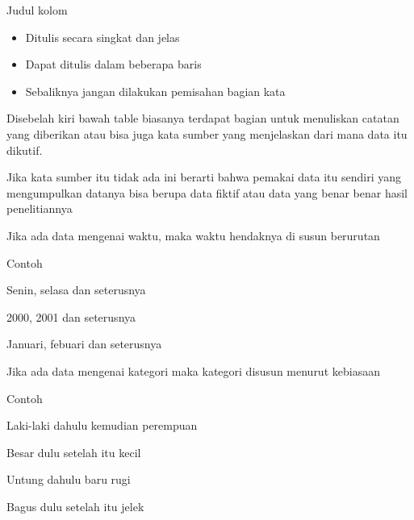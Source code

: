 \vspace{\baselineskip}
\noindent Judul kolom\par

\begin{itemize}
	\vspace{\baselineskip}
	\item Ditulis secara singkat dan jelas\par
\vspace{\baselineskip}
	\item Dapat ditulis dalam beberapa baris\par
\vspace{\baselineskip}
	\item Sebaliknya jangan dilakukan pemisahan bagian kata
\end{itemize}\par

\vspace{\baselineskip}

Disebelah kiri bawah table biasanya terdapat bagian untuk menuliskan catatan yang diberikan atau bisa juga kata sumber yang menjelaskan dari mana data itu dikutif. \par 

\vspace{\baselineskip}
Jika kata sumber itu tidak ada ini berarti bahwa pemakai data itu sendiri yang mengumpulkan datanya bisa berupa data fiktif atau data yang benar benar hasil penelitiannya\par

\vspace{\baselineskip}

 Jika ada data mengenai waktu, maka waktu hendaknya di susun berurutan\par

\vspace{\baselineskip}
\noindent Contoh\par

\vspace{\baselineskip}
Senin, selasa dan seterusnya\par
\vspace{\baselineskip}
2000, 2001 dan seterusnya\par
\vspace{\baselineskip}
Januari, febuari dan seterusnya\par

\vspace{\baselineskip}

 Jika ada data mengenai kategori maka kategori disusun menurut kebiasaan\par

\vspace{\baselineskip}
\noindent Contoh\par

\vspace{\baselineskip}

Laki-laki dahulu kemudian perempuan\par

\vspace{\baselineskip}
Besar dulu setelah itu kecil\par

\vspace{\baselineskip}
Untung dahulu baru rugi \par

\vspace{\baselineskip}
Bagus dulu setelah itu jelek\par
